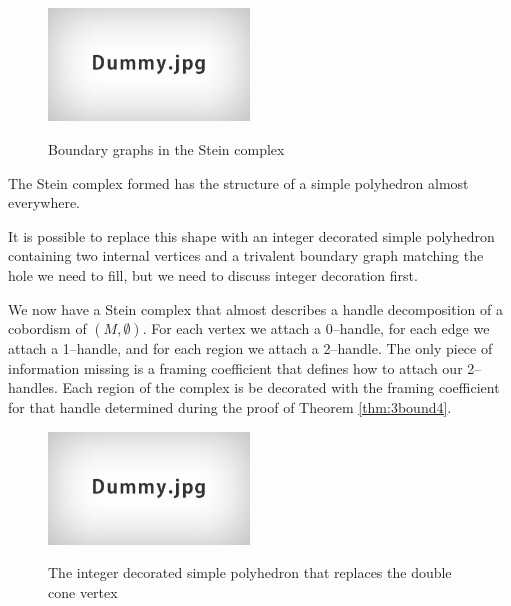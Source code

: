 												
													
													\begin{figure}
														\centering
														\captionsetup{justification=centering}
														\caption{Boundary graphs in the Stein complex}
														\includegraphics[height=3cm]{figures/dummy.jpg}
														\label{fig:holegraphs}
													\end{figure}
												
												The Stein complex formed has the structure of a simple polyhedron almost everywhere.
												
												
												It is possible to replace this shape with an integer decorated simple polyhedron containing two internal vertices and a trivalent boundary graph matching the hole we need to fill, but we need to discuss integer decoration first.
												
												We now have a Stein complex that almost describes a handle decomposition of a cobordism of $(M,\emptyset)$.
												For each vertex we attach a 0--handle, for each edge we attach a 1--handle, and for each region we attach a 2--handle.
												The only piece of information missing is a framing coefficient that defines how to attach our 2--handles.
												Each region of the complex is be decorated with the framing coefficient for that handle determined during the proof of Theorem \ref{thm:3bound4}.
												
												\begin{figure}
													\centering
													\captionsetup{justification=centering}
													\caption{The integer decorated simple polyhedron that replaces the double cone vertex}
													\includegraphics[height=3cm]{figures/dummy.jpg}
													\label{fig:simplepoly}
												\end{figure}
												
